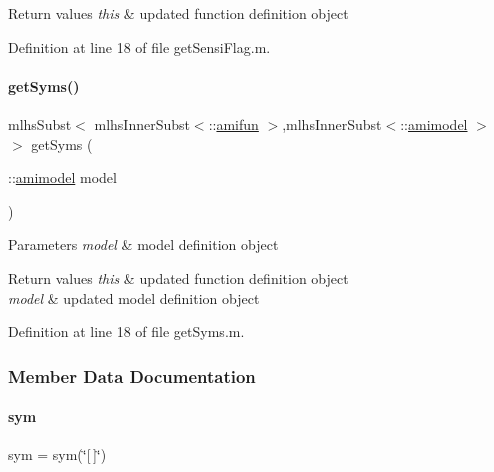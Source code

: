 \begin{DoxyRetVals}{Return values}
{\em this} & updated function definition object \\
\hline
\end{DoxyRetVals}


Definition at line 18 of file get\+Sensi\+Flag.\+m.

\mbox{\label{classamifun_a44e49602645d85f94841f38e4673fa1a}} 
\paragraph{\texorpdfstring{getSyms()}{getSyms()}}
{\footnotesize\ttfamily mlhs\+Subst$<$ mlhs\+Inner\+Subst$<$\+::\mbox{\hyperlink{classamifun}{amifun}} $>$,mlhs\+Inner\+Subst$<$\+::\mbox{\hyperlink{classamimodel}{amimodel}} $>$ $>$ get\+Syms (\begin{DoxyParamCaption}\item[{\+::\mbox{\hyperlink{classamimodel}{amimodel}}}]{model }\end{DoxyParamCaption})}


\begin{DoxyParams}{Parameters}
{\em model} & model definition object\\
\hline
\end{DoxyParams}

\begin{DoxyRetVals}{Return values}
{\em this} & updated function definition object \\
\hline
{\em model} & updated model definition object \\
\hline
\end{DoxyRetVals}


Definition at line 18 of file get\+Syms.\+m.



\subsubsection{Member Data Documentation}
\mbox{\label{classamifun_a3c48fff3d28406486a4f1b5e18da7ca6}} 
\paragraph{\texorpdfstring{sym}{sym}}
{\footnotesize\ttfamily sym = sym(\char`\"{}\mbox{[}$\,$\mbox{]}\char`\"{})}

